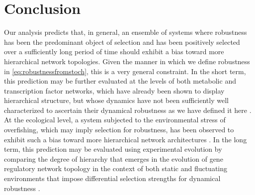\section{Conclusion}
Our analysis predicts that, in general, an ensemble of systems where robustness has been the predominant object of selection and has been positively selected over a sufficiently long period of time should exhibit a bias toward more hierarchical network topologies. Given the manner in which we define robustness in \ref{eq:robustnessfromstoch}, this is a very general constraint. In the short term, this prediction may be further evaluated at the levels of both metabolic and transcription factor networks, which have already been shown to display hierarchical structure, but whose dynamics have not been sufficiently well characterized to ascertain their dynamical robustness as we have defined it here \cite{Zhao2006,Bhardwaj2010,Colm}. At the ecological level, a system subjected to the environmental stress of overfishing, which may imply selection for robustness, has been observed to exhibit such a bias toward more hierarchical network architectures \cite{Bascompte2005}.
In the long term, this prediction may be evaluated using experimental evolution by comparing the degree of hierarchy that emerges in the evolution of gene regulatory network topology in the context of both static and fluctuating environments that impose differential selection strengths for dynamical robustness \cite{Leroi1994}.

